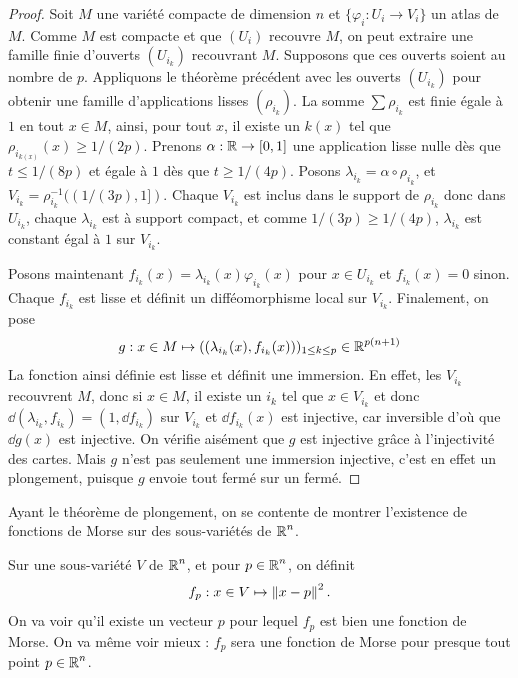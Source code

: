 \begin{proof}
    Soit $M$ une variété compacte de dimension $n$ et $\lbrace\varphi_i:U_i\to V_i\rbrace$ un atlas de $M$. 
    Comme $M$ est compacte et que $(U_i)$ recouvre $M$, on peut extraire une famille finie 
    d'ouverts $(U_{i_k})$ recouvrant $M$. 
    Supposons que ces ouverts soient au nombre de $p$.
    Appliquons le théorème précédent avec les ouverts $(U_{i_k})$ pour obtenir une famille 
    d'applications lisses $(\rho_{i_k})$.
    La somme $\sum\rho_{i_k}$ est finie égale à $1$ en tout $x\in M$, ainsi, pour tout $x$, 
    il existe un $k(x)$ tel que $\rho_{i_{k(x)}}(x)\geq1/(2p)$.
    Prenons $\alpha:\operatorname{\mathbb R}\to[0,1]$ une application lisse nulle dès que $t\leq 1/(8p)$ et égale 
    à $1$ dès que $t\geq 1/(4p)$.
    Posons $\lambda_{i_k}=\alpha\circ\rho_{i_k}$, et $V_{i_k}=\rho_{i_k}^{-1}((1/(3p),1])$.
    Chaque $V_{i_k}$ est inclus dans le support de $\rho_{i_k}$ donc dans $U_{i_k}$, chaque 
    $\lambda_{i_k}$ est à support compact, et comme $1/(3p)\geq1/(4p)$, $\lambda_{i_k}$ est 
    constant égal à $1$ sur $V_{i_k}$.


    Posons maintenant $f_{i_k}(x)=\lambda_{i_k}(x)\varphi_{i_k}(x)$ pour $x\in U_{i_k}$ et 
    $f_{i_k}(x)=0$ sinon.
    Chaque $f_{i_k}$ est lisse et définit un difféomorphisme local sur $V_{i_k}$. 
    Finalement, on pose 
    \[
        g:x\in M\mapsto ((\lambda_{i_k}(x),f_{i_k}(x)))_{1\leq k\leq p}\in\operatorname{\mathbb R}^{p(n+1)}
    \]
    La fonction ainsi définie est lisse et définit une immersion. 
    En effet, les $V_{i_k}$ recouvrent $M$, donc si $x\in M$, il existe un $i_k$ tel 
    que $x\in V_{i_k}$ et donc $\dd(\lambda_{i_k},f_{i_k})=(1,\dd f_{i_k})$ sur $V_{i_k}$ 
    et $\dd f_{i_k}(x)$ est injective, car inversible d'où que $\dd g(x)$ est injective. 
    On vérifie aisément que $g$ est injective grâce à l'injectivité des cartes.
    Mais $g$ n'est pas seulement une immersion injective, c'est en effet un plongement,
    puisque $g$ envoie tout fermé sur un fermé.
\end{proof}

Ayant le théorème de plongement, on se contente de montrer l'existence de fonctions de Morse 
sur des sous-variétés de $\operatorname{\mathbb R}^n$.

Sur une sous-variété $V$ de $\operatorname{\mathbb R}^n$, et pour $p\in\operatorname{\mathbb R}^n$, on définit 
\[
    f_p:x\in V\mapsto \left\lVert x-p\right\rVert^2.
\]
On va voir qu'il existe un vecteur $p$ pour lequel $f_p$ est bien une fonction de Morse. 
On va même voir mieux : $f_p$ sera une fonction de Morse pour presque tout point $p\in\operatorname{\mathbb R}^n$.

